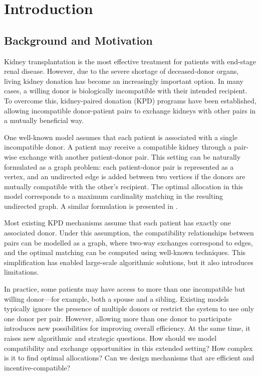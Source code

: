 \chapter{Introduction}
\label{cha:introduction}


\section{Background and Motivation}

Kidney transplantation is the most effective treatment for patients with end-stage renal disease. However, due to the severe shortage of deceased-donor organs, living kidney donation has become an increasingly important option. In many cases, a willing donor is biologically incompatible with their intended recipient. To overcome this, kidney-paired donation (KPD) programs have been established, allowing incompatible donor-patient pairs to exchange kidneys with other pairs in a mutually beneficial way.

One well-known model assumes that each patient is associated with a single incompatible donor. A patient may receive a compatible kidney through a pair-wise exchange with another patient-donor pair. This setting can be naturally formulated as a graph problem: each patient-donor pair is represented as a vertex, and an undirected edge is added between two vertices if the donors are mutually compatible with the other’s recipient. The optimal allocation in this model corresponds to a maximum cardinality matching in the resulting undirected graph. A similar formulation is presented in \cite{roth2004kidney}.


Most existing KPD mechanisms assume that each patient has exactly one associated donor. Under this assumption, the compatibility relationships between pairs can be modelled as a graph, where two-way exchanges correspond to edges, and the optimal matching can be computed using well-known techniques. This simplification has enabled large-scale algorithmic solutions, but it also introduces limitations.

In practice, some patients may have access to more than one incompatible but willing donor—for example, both a spouse and a sibling. Existing models typically ignore the presence of multiple donors or restrict the system to use only one donor per pair. However, allowing more than one donor to participate introduces new possibilities for improving overall efficiency. At the same time, it raises new algorithmic and strategic questions. How should we model compatibility and exchange opportunities in this extended setting? How complex is it to find optimal allocations? Can we design mechanisms that are efficient and incentive-compatible?

